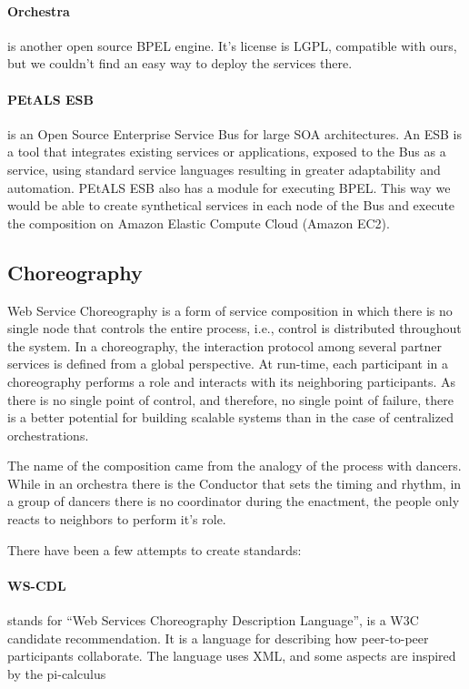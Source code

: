 \paragraph{Orchestra}
is another open source BPEL engine. It's license is LGPL, compatible with ours, but we couldn't find an easy way to deploy the services there.

\paragraph{PEtALS ESB}
is an Open Source Enterprise Service Bus for large SOA architectures. \citep{PEtALS} An ESB is a tool that integrates existing services or applications, exposed to the Bus as a service, using standard service languages resulting in greater adaptability and automation. PEtALS ESB also has a module for executing BPEL. This way we would be able to create synthetical services in each node of the Bus and execute the composition on Amazon Elastic Compute Cloud (Amazon EC2).



\subsection{Choreography}
Web Service Choreography is a form of service composition in which there is no single node that controls the entire process, i.e., control is distributed throughout the system. In a choreography, the interaction protocol among several partner services is defined from a global perspective. At run-time, each participant in a choreography performs a role and interacts with its neighboring participants. As there is no single point of control, and therefore, no single point of failure, there is a better potential for building scalable systems than in the case of centralized orchestrations.

The name of the composition came from the analogy of the process with dancers. While in an orchestra there is the Conductor that sets the timing and rhythm, in a group of dancers there is no coordinator during the enactment, the people only reacts to neighbors to perform it's role.

There have been a few attempts to create standards:

\paragraph{WS-CDL}
stands for ``Web Services Choreography Description Language'', is a W3C candidate recommendation. It is a language for describing how peer-to-peer participants collaborate. The language uses XML, and some aspects are inspired by the pi-calculus

